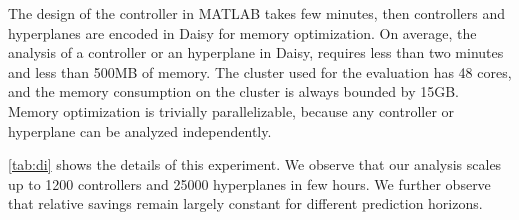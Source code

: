  

The design of the controller in MATLAB takes few minutes, then controllers and
hyperplanes are encoded in Daisy for memory optimization. On average, the
analysis of a controller or an hyperplane in Daisy, requires less than two
minutes and less than 500MB of memory. The cluster used for the evaluation has
48 cores, and the memory consumption on the cluster is always bounded by
15GB. Memory optimization is trivially parallelizable, because any controller or
hyperplane can be analyzed independently.


\autoref{tab:di} shows the details of this experiment.
We observe that our analysis scales up to 1200 controllers and 25000 hyperplanes in few
hours. 
We further observe that relative savings remain largely constant for different 
prediction horizons.

